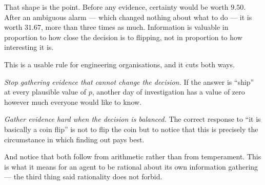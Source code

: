 That shape is the point. Before any evidence, certainty would be worth $9.50$.
After an ambiguous alarm --- which changed nothing about what to do --- it is worth
$31.67$, more than three times as much. Information is valuable in proportion to
how close the decision is to flipping, not in proportion to how interesting it is.

\begin{conceptbox}
This is a usable rule for engineering organisations, and it cuts both ways.

\emph{Stop gathering evidence that cannot change the decision.} If the answer is
``ship'' at every plausible value of $p$, another day of investigation has a value
of zero however much everyone would like to know.

\emph{Gather evidence hard when the decision is balanced.} The correct response to
``it is basically a coin flip'' is not to flip the coin but to notice that this is
precisely the circumstance in which finding out pays best.

And notice that both follow from arithmetic rather than from temperament. This is
what it means for an agent to be rational about its own information gathering ---
the third thing  said rationality does not forbid.
\end{conceptbox}

